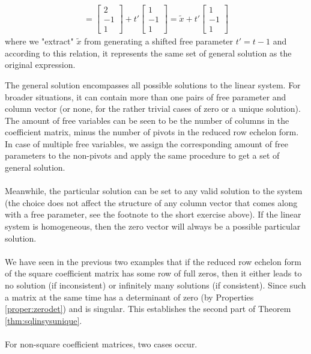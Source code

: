 {\begin{align*}
=
\begin{bmatrix}
2 \\
-1 \\
1
\end{bmatrix}
+
t'
\begin{bmatrix}
1 \\
-1 \\
1
\end{bmatrix}
= \tilde{x} + t'
\begin{bmatrix}
1 \\
-1 \\
1
\end{bmatrix}
\end{align*}
where we "extract" $\tilde{x}$ from generating a shifted free parameter $t' = t-1$ and according to this relation, it represents the same set of general solution as the original expression.}\par
The general solution encompasses all possible solutions to the linear system. For broader situations, it can contain more than one pairs of free parameter and column vector (or none, for the rather trivial cases of zero or a unique solution). The amount of free variables can be seen to be the number of columns in the coefficient matrix, minus the number of pivots in the reduced row echelon form. In case of multiple free variables, we assign the corresponding amount of free parameters to the non-pivots and apply the same procedure to get a set of general solution. \\
\\
Meanwhile, the particular solution can be set to any valid solution to the system (the choice does not affect the structure of any column vector that comes along with a free parameter, see the footnote to the short exercise above). If the linear system is homogeneous, then the zero vector will always be a possible particular solution. \\
\\
We have seen in the previous two examples that if the reduced row echelon form of the square coefficient matrix has some row of full zeros, then it either leads to no solution (if inconsistent) or infinitely many solutions (if consistent). Since such a matrix at the same time has a determinant of zero (by Properties \ref{proper:zerodet}) and is singular. This establishes the second part of Theorem \ref{thm:sqlinsysunique}. \\
\\
For non-square coefficient matrices, two cases occur.

